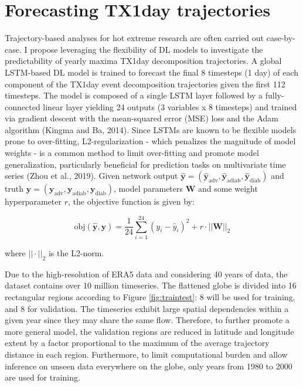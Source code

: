 \documentclass[11pt,a4paper,twoside,openright]{report}
\theoremstyle{definition}
\begin{document}
\section{Forecasting TX1day trajectories}\label{forecasting-tx1day-trajectories}

Trajectory-based analyses for hot extreme research are often carried out case-by-case. I propose leveraging the flexibility of DL models to investigate the predictability of yearly maxima TX1day decomposition trajectories. A global LSTM-based DL model is trained to forecast the final 8 timesteps (1 day) of each component of the TX1day event decomposition trajectories given the first 112 timesteps. The model is composed of a single LSTM layer followed by a fully-connected linear layer yielding 24 outputs (3 variables x 8 timesteps) and trained via gradient descent with the mean-squared error (MSE) loss and the Adam algorithm (Kingma and Ba, 2014). Since LSTMs are known to be flexible models prone to over-fitting, L2-regularization - which penalizes the magnitude of model weights - is a common method to limit over-fitting and promote model generalization, particularly beneficial for prediction tasks on multivariate time series (Zhou et al., 2019). Given network output \(\mathbf{\hat{y}} = (\mathbf{\hat{y}}_{\text{adv}}, \mathbf{\hat{y}}_{\text{adiab}}, \mathbf{\hat{y}}_{\text{diab}})\) and truth \(\mathbf{y} = (\mathbf{y}_{\text{adv}}, \mathbf{y}_{\text{adiab}}, \mathbf{y}_{\text{diab}})\), model parameters \(\mathbf{W}\) and some weight hyperparameter \(r\), the objective function is given by:

\begin{equation}
   \text{obj}(\mathbf{\hat{y}},\mathbf{y}) = \frac{1}{24}\sum_{i=1}^{24} (y_i - \hat{y}_i)^2 + r \cdot || \mathbf{W} ||_2 
\label{eq:obj}
\end{equation}

where \(||\cdot ||_2\) is the L2-norm.

Due to the high-resolution of ERA5 data and considering 40 years of data, the dataset contains over 10 million timeseries. The flattened globe is divided into 16 rectangular regions according to Figure \ref{fig:traintest}: 8 will be used for training, and 8 for validation. The timeseries exhibit large spatial dependencies within a given year since they may share the same flow. Therefore, to further promote a more general model, the validation regions are reduced in latitude and longitude extent by a factor proportional to the maximum of the average trajectory distance in each region. Furthermore, to limit computational burden and allow inference on unseen data everywhere on the globe, only years from 1980 to 2000 are used for training.
\end{document}
